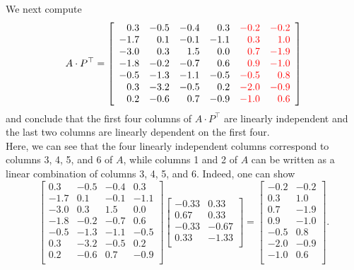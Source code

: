 We next compute
\begin{equation}
A \cdot P^\top=\left[
\begin{array}{rrrrrr}
0.3 & -0.5 & -0.4 & 0.3 & \color{red} -0.2 & \color{red} -0.2 \\
-1.7 & 0.1 & -0.1 & -1.1 & \color{red} 0.3 & \color{red} 1.0 \\
-3.0 & 0.3 & 1.5 & 0.0 & \color{red} 0.7 &\color{red} -1.9 \\
-1.8 & -0.2 & -0.7 & 0.6 & \color{red} 0.9 & \color{red} -1.0 \\
-0.5 & -1.3 & -1.1 & -0.5 & \color{red} -0.5 &\color{red} 0.8 \\
0.3 & -3.2 & -0.5 & 0.2 & \color{red} -2.0 &\color{red} -0.9 \\
0.2 & -0.6 & 0.7 & -0.9 & \color{red} -1.0 &\color{red} 0.6 \\
\end{array}
\right]
\end{equation}
and conclude that the first four columns of $A \cdot P^\top$ are linearly independent and the last two columns are linearly dependent on the first four. \\

Here, we can see that the four linearly independent columns correspond to columns 3, 4, 5, and 6 of $A$, while columns 1 and 2 of $A$ can be written as a linear combination of columns 3, 4, 5, and 6. Indeed, one can show
\begin{equation}
\left[
\begin{array}{rrrr}
0.3 & -0.5 & -0.4 & 0.3 \\
-1.7 & 0.1 & -0.1 & -1.1 \\
-3.0 & 0.3 & 1.5 & 0.0 \\
-1.8 & -0.2 & -0.7 & 0.6 \\
-0.5 & -1.3 & -1.1 & -0.5 \\
0.3 & -3.2 & -0.5 & 0.2 \\
0.2 & -0.6 & 0.7 & -0.9 \\
\end{array}
\right] \left[
\begin{array}{rr}
-0.33 & 0.33 \\
0.67 & 0.33 \\
-0.33 & -0.67 \\
0.33 & -1.33 \\
\end{array}
\right] = \left[
\begin{array}{rr}
-0.2 & -0.2 \\
0.3 & 1.0 \\
0.7 & -1.9 \\
0.9 & -1.0 \\
-0.5 & 0.8 \\
-2.0 & -0.9 \\
-1.0 & 0.6 \\
\end{array}
\right].
\end{equation}
 \Qed


